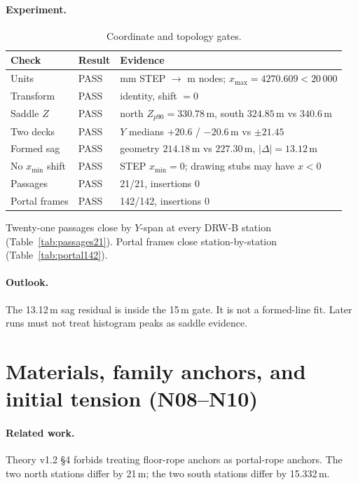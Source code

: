 \documentclass[11pt,a4paper]{article}
\begin{document}
\paragraph{Experiment.}
\begin{table}[ht]
\centering
\caption{Coordinate and topology gates.}
\label{tab:gates}
\begin{tabular}{lll}
\toprule
Check & Result & Evidence \\
\midrule
Units & PASS & mm STEP \(\to\) m nodes; \(x_{\max}=4270.609<20\,000\) \\
Transform & PASS & identity, shift \(=0\) \\
Saddle \(Z\) & PASS & north \(Z_{p90}=330.78\)\,m, south \(324.85\)\,m vs \(340.6\)\,m \\
Two decks & PASS & \(Y\) medians \(+20.6\) / \(-20.6\)\,m vs \(\pm 21.45\) \\
Formed sag & PASS & geometry \(214.18\)\,m vs \(227.30\)\,m, \(|\Delta|=13.12\)\,m \\
No \(x_{\min}\) shift & PASS & STEP \(x_{\min}=0\); drawing stubs may have \(x<0\) \\
Passages & PASS & 21/21, insertions 0 \\
Portal frames & PASS & 142/142, insertions 0 \\
\bottomrule
\end{tabular}
\end{table}

Twenty-one passages close by \(Y\)-span at every DRW-B station
(Table~\ref{tab:passages21}). Portal frames close station-by-station
(Table~\ref{tab:portal142}).

\paragraph{Outlook.}
The 13.12\,m sag residual is inside the 15\,m gate. It is not a formed-line
fit. Later runs must not treat histogram peaks as saddle evidence.



\section{Materials, family anchors, and initial tension (N08--N10)}
\label{sec:mat}

\paragraph{Related work.}
Theory v1.2 \S4 forbids treating floor-rope anchors as portal-rope anchors.
The two north stations differ by 21\,m; the two south stations differ by
15.332\,m.
\end{document}
